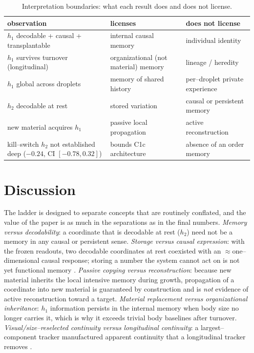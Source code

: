 \documentclass[11pt]{article}
\begin{document}
\begin{table}[t]\centering\small
\caption{Interpretation boundaries: what each result does and does not license.}
\label{tab:boundaries}
\begin{tabular}{@{}p{4.4cm}p{4.4cm}p{4.4cm}@{}}\toprule observation & licenses & does not license\\\midrule
$h_1$ decodable + causal + transplantable & internal causal memory & individual identity\\
$h_1$ survives turnover (longitudinal) & organizational (not material) memory & lineage / heredity\\
$h_1$ global across droplets & memory of shared history & per--droplet private experience\\
$h_2$ decodable at rest & stored variation & causal or persistent memory\\
new material acquires $h_1$ & passive local propagation & active reconstruction\\
kill--switch $h_2$ not established deep ($-0.24$, CI $[-0.78,0.32]$) & bounds C1c architecture & absence of an order memory\\\bottomrule
\end{tabular}
\end{table}

\section{Discussion}
The ladder is designed to separate concepts that are routinely conflated, and the value of the paper is as much in
the separations as in the final numbers. \emph{Memory versus decodability}: a coordinate that is decodable at rest
($h_2$) need not be a memory in any causal or persistent sense. \emph{Storage versus causal expression}: with the
frozen readouts, two decodable coordinates at rest coexisted with an $\approx$one--dimensional causal response;
storing a number the system cannot act on is not yet functional memory \citep{pearl2009}. \emph{Passive copying
versus reconstruction}: because new material inherits the local intensive memory during growth, propagation of a
coordinate into new material is guaranteed by construction and is \emph{not} evidence of active reconstruction
toward a target. \emph{Material replacement versus organizational inheritance}: $h_1$ information persists in the
internal memory when body size no longer carries it, which is why it exceeds trivial body baselines after turnover.
\emph{Visual/size--reselected continuity versus longitudinal continuity}: a largest--component tracker manufactured
apparent continuity that a longitudinal tracker removes \citep{jaqaman2008,rosenfeld1966}.
\end{document}
